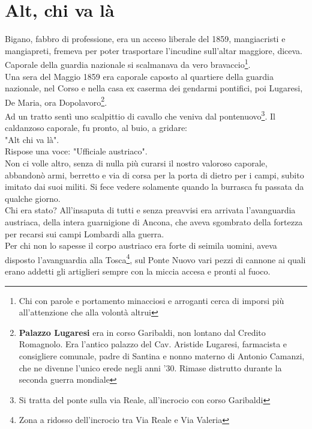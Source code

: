 
\chapter{Alt, chi va là}
Bigano, fabbro di professione, era un acceso liberale del 1859, mangiacristi e mangiapreti, fremeva per poter trasportare l'incudine sull'altar maggiore, diceva. Caporale della guardia nazionale si scalmanava da vero bravaccio\footnote{Chi con parole e portamento minacciosi e arroganti cerca di imporsi più all'attenzione che alla volontà altrui}.\\
\indent Una sera del Maggio 1859 era caporale caposto al quartiere della guardia nazionale, nel Corso e nella casa ex caserma dei gendarmi pontifici, poi Lugaresi, De Maria, ora Dopolavoro\footnote{\textbf{Palazzo Lugaresi} era in corso Garibaldi, non lontano dal Credito Romagnolo. Era l'antico palazzo del Cav. Aristide Lugaresi, farmacista e consigliere comunale, padre di Santina e nonno materno di Antonio Camanzi, che ne divenne l'unico erede negli anni '30. Rimase distrutto durante la seconda guerra mondiale}.\\Ad un tratto sentì uno scalpittio di cavallo che veniva dal pontenuovo\footnote{Si tratta del ponte sulla via Reale, all'incrocio con corso Garibaldi}. Il caldanzoso caporale, fu pronto, al buio, a gridare:\\
\indent "Alt chi va là".\\
\indent Rispose una voce: "Ufficiale austriaco".\\
\indent Non ci volle altro, senza di nulla più curarsi il nostro valoroso caporale, abbandonò armi, berretto e via di corsa per la porta di dietro per i campi, subito imitato dai suoi militi. Si fece vedere solamente quando la burrasca fu passata da qualche giorno.\\
\indent Chi era stato? All'insaputa di tutti e senza preavvisi era arrivata l'avanguardia austriaca, della intera guarnigione di Ancona, che aveva sgombrato della fortezza per recarsi sui campi Lombardi alla guerra.\\
\indent Per chi non lo sapesse il corpo austriaco era forte di seimila uomini, aveva disposto l'avanguardia alla Tosca\footnote{Zona a ridosso dell'incrocio tra Via Reale e Via Valeria}, sul Ponte Nuovo vari pezzi di cannone ai quali erano addetti gli artiglieri sempre con la miccia accesa e pronti al fuoco.\\
